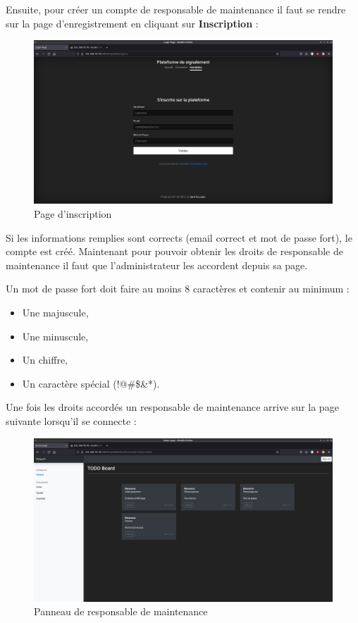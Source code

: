 Ensuite, pour créer un compte de responsable de maintenance il faut se rendre sur la page
d'enregistrement en cliquant sur \textbf{Inscription} :
\begin{figure}[!h]
    \centering
    \includegraphics[width=\textwidth]{img/sign-up.png}
    \caption{Page d'inscription}
\end{figure}

Si les informations remplies sont corrects (email correct et mot de passe fort), le compte est
créé. Maintenant pour pouvoir obtenir les droits de responsable de maintenance il faut que
l'administrateur les accordent depuis sa page.

Un mot de passe fort doit faire au moins 8 caractères et contenir au minimum :
\begin{itemize}
    \item Une majuscule,
    \item Une minuscule,
    \item Un chiffre,
    \item Un caractère spécial (!@\#\$\&*).
\end{itemize}
\newpage

Une fois les droits accordés un responsable de maintenance arrive sur la page suivante lorsqu'il
se connecte :
\begin{figure}[!h]
    \centering
    \includegraphics[width=\textwidth]{img/maintainer.png}
    \caption{Panneau de responsable de maintenance}
\end{figure}

